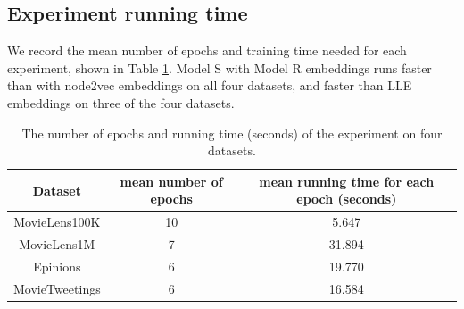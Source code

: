 \documentclass[12pt]{WSUThesis}
\theoremstyle{definition}
\begin{document}
\subsection{Experiment running time}
We record the mean number of epochs and training time needed for each experiment, shown in Table \ref{tab:time-recommendation}.
Model S with Model R embeddings runs faster than with node2vec embeddings on all four datasets, and faster than LLE embeddings on three of the four datasets.
\begin{table}[!htb]
	\centering
	\caption{
		The number of epochs and running time (seconds) of the experiment on four datasets.
	}
	\begin{tabular}{ccc} \hline \rowcolor{blue!30}
		Dataset & mean number of epochs & mean running time for each epoch (seconds) \\ \hline
		MovieLens100K & 10 & 5.647 \\ \hline
		MovieLens1M & 7 & 31.894 \\ \hline
		Epinions & 6 & 19.770 \\ \hline
		MovieTweetings & 6 & 16.584 \\ \hline
	\end{tabular}
	\label{tab:time-recommendation}
\end{table}
\end{document}
